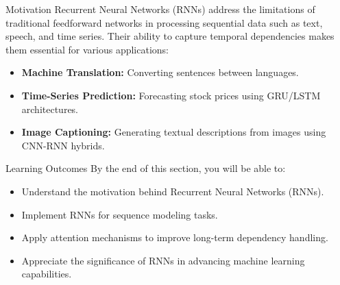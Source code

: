 \begin{frame}{Motivation}
    Recurrent Neural Networks (RNNs) address the limitations of traditional feedforward networks 
    in processing sequential data such as text, speech, and time series. Their ability to capture 
    temporal dependencies makes them essential for various applications:
    \begin{itemize}
        \item \textbf{Machine Translation:} Converting sentences between languages.
        \item \textbf{Time-Series Prediction:} Forecasting stock prices using GRU/LSTM architectures.
        \item \textbf{Image Captioning:} Generating textual descriptions from images using CNN-RNN hybrids.
    \end{itemize}
\end{frame}

\begin{frame}{Learning Outcomes}
    By the end of this section, you will be able to:
    \begin{itemize}
        \item Understand the motivation behind Recurrent Neural Networks (RNNs).
        \item Implement RNNs for sequence modeling tasks.
        \item Apply attention mechanisms to improve long-term dependency handling.
        \item Appreciate the significance of RNNs in advancing machine learning capabilities.
    \end{itemize}
\end{frame}